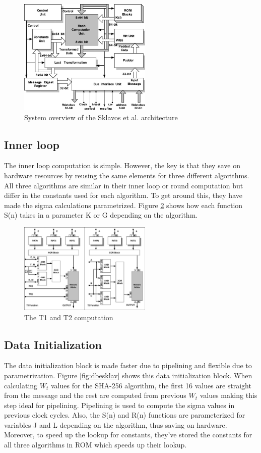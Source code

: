 \documentclass[conference]{IEEEtran}
\begin{document}
\begin{figure}[!t]
\centering
\includegraphics[width=2.5in]{archsklav}
\caption{System overview of the Sklavos et al. architecture}
\label{fig:archsklav}
\end{figure}

\subsection{Inner loop}
The inner loop computation is simple. However, the key is that they save on hardware resources by reusing the same elements for three  different algorithms. All three algorithms are similar in their inner loop or round computation but differ in the constants used for each algorithm. To get around this, they have made the sigma calculations parametrized. Figure \ref{fig:t1t2sklav} shows how each function S(n) takes in a parameter K or G depending on the algorithm.

\begin{figure}[!t]
\centering
\includegraphics[width=2.5in]{t1t2sklav}
\caption{The T1 and T2 computation	}
\label{fig:t1t2sklav}
\end{figure}

\subsection{Data Initialization}
The data initialization block is made faster due to pipelining and flexible due to parametrization. Figure \ref{fig:dbesklav} shows this data initialization block. When calculating $W_t$ values for the SHA-256 algorithm, the first 16 values are straight from the message and the rest are computed from previous $W_t$ values making this step ideal for pipelining. Pipelining is used to compute the sigma values in previous clock cycles. Also, the S(n) and R(n) functions are parameterized for variables J and L depending on the algorithm, thus saving on hardware. Moreover, to speed up the lookup for constants, they've stored the constants for all three algorithms in ROM which speeds up their lookup.
\end{document}
